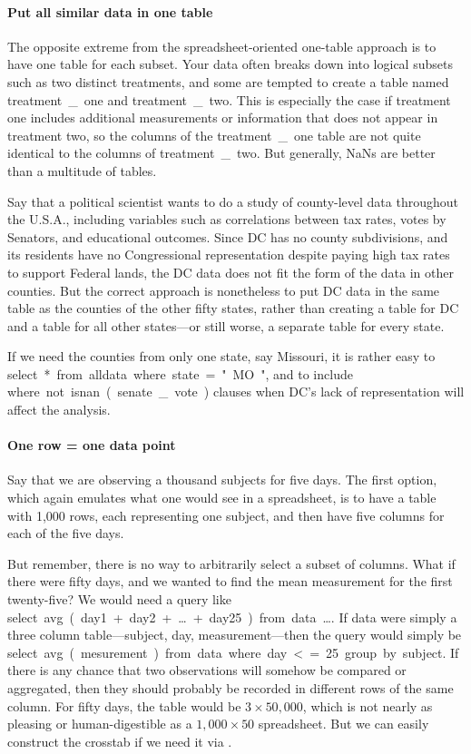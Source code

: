 \paragraph{Put all similar data in one table} The opposite extreme from
the spread\-sheet-oriented one-table approach is to have one table for
each subset. Your data often breaks
down into logical subsets such as two distinct treatments, and 
some are tempted to create a table named \si{treatment\_one} and 
\si{treatment\_two}. This is especially the case if treatment one
includes additional measurements or information that does not appear in
treatment two, so the columns of the \si{treatment\_one} table are not
quite identical to the columns of \si{treatment\_two}. But generally,
\si{NaN}s are better than a multitude of tables.

Say that a political scientist wants to do
a study of county-level data throughout the U.S.A., including variables
such as correlations between tax rates, votes by Senators, and educational
outcomes. Since DC has no county subdivisions, and its residents have no
Congressional representation despite paying high tax rates to support
Federal lands, the DC data does not fit the form of the data in other
counties. But the correct approach is nonetheless to put DC data in
the same table as the counties of the other fifty states, rather than
creating a table for DC and a table for all other states---or still worse,
a separate table for every state. 

If we need the counties from only one state, say Missouri, it is
rather easy to \si{select * from alldata where state="MO"}, and to
include \si{where not isnan(senate\_vote)} clauses when DC's lack of
representation will affect the analysis.

\paragraph{One row = one data point} Say that we are observing a
thousand subjects for five days. The first option, which again emulates
what one would see in a spreadsheet, is to have a table with 1,000
rows, each representing one subject, and then have five columns for each
of the five days. 

But remember, there is no way to arbitrarily select a subset of columns.
What if there were fifty days, and we wanted to find the mean measurement for the first
twenty-five? We would need a query like \si{select avg(day1 + day2 +
\dots + day25) from data \dots}. If \si{data} were simply a three column table---\si{subject}, \si{day}, \si{measurement}---then the query would simply be
\si{select avg(mesurement) from data where day <=25 group by subject}. If there is any
chance that two observations will somehow be compared or aggregated,
then they should probably be recorded in different rows of the same
column. For fifty days, the table would be $3 \times 50,000$, which
is not nearly as pleasing or human-digestible as a $1,000 \times 50$
spreadsheet. But we can easily construct the crosstab if we need it
via .

